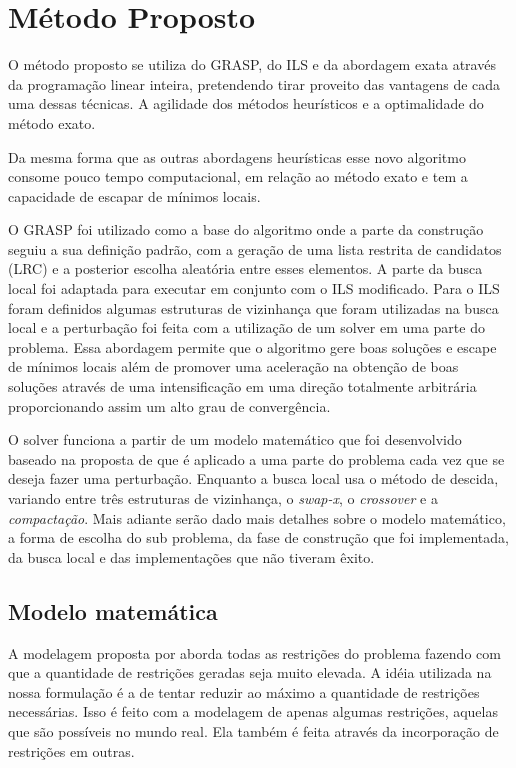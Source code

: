 \chapter{Método Proposto}
  
O método proposto se utiliza do GRASP, do ILS e da abordagem exata através da
programação linear inteira, pretendendo tirar proveito das vantagens de cada
uma dessas técnicas. A agilidade dos métodos heurísticos e a optimalidade do
método exato.
  
Da mesma forma que as outras abordagens heurísticas esse novo algoritmo
consome pouco tempo computacional, em relação ao método exato e tem a capacidade
de escapar de mínimos locais.
  
O GRASP foi utilizado como a base do algoritmo onde a parte da construção
seguiu a sua definição padrão, com a geração de uma lista restrita de candidatos
(LRC) e a posterior escolha aleatória entre esses elementos. A parte da busca
local foi adaptada para executar em conjunto com o ILS modificado. Para o ILS
foram definidos algumas estruturas de vizinhança que foram utilizadas
na busca local e a perturbação foi feita com a utilização de um solver em uma
parte do problema. Essa abordagem permite que o algoritmo gere boas
soluções e escape de mínimos locais além de promover uma aceleração na obtenção
de boas soluções através de uma intensificação em uma direção totalmente
arbitrária proporcionando assim um alto grau de convergência.


O solver funciona a partir de um modelo matemático que foi desenvolvido baseado
na proposta de \cite{pontes2002} que é aplicado a uma parte do problema cada
vez que se deseja fazer uma perturbação. Enquanto a busca local usa o método de
descida, variando entre três estruturas de vizinhança, o \textit{swap-x}, o
\textit{crossover} e a \textit{compactação}. Mais adiante serão dado mais
detalhes sobre o modelo matemático, a forma de escolha do sub problema, da fase
de construção que foi implementada, da busca local e das implementações que não
tiveram êxito.

\section{Modelo matemática}

   
A modelagem proposta por \cite{pontes2002} aborda todas as restrições do
problema fazendo com que a quantidade de restrições geradas seja muito elevada.
A idéia utilizada na nossa formulação é a de tentar reduzir ao máximo a
quantidade de restrições necessárias. Isso é feito com a modelagem de apenas
algumas restrições, aquelas que são possíveis no mundo real. Ela também
é feita através da incorporação de restrições em outras.

